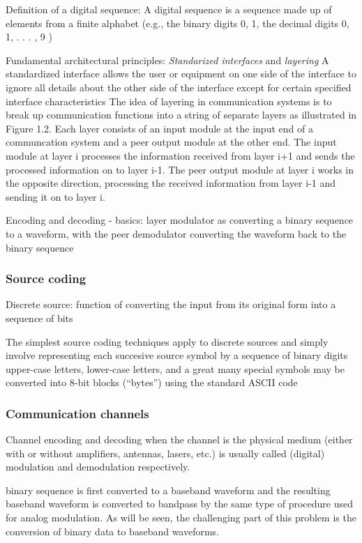 \documentclass[12pt,a4paper]{report}
\begin{document}
Definition of a digital sequence: A digital sequence is a sequence made up of elements from a finite alphabet (e.g., the binary digits {0, 1},
the decimal digits {0, 1, . . . , 9} )


Fundamental architectural principles:
	\textit{Standarized interfaces} and \textit{layering}
	A standardized interface allows the user or equipment on one side of the interface to ignore all
details about the other side of the interface except for certain specified interface characteristics
	The idea of layering in communication systems is to break up communication functions into a
string of separate layers as illustrated in Figure 1.2.
Each layer consists of an input module at the input end of a communcation system and a peer
output module at the other end. The input module at layer i processes the information received
from layer i+1 and sends the processed information on to layer i-1. The peer output module at
layer i works in the opposite direction, processing the received information from layer i-1 and
sending it on to layer i.

Encoding and decoding - basics: layer modulator as converting a
binary sequence to a waveform, with the peer demodulator converting the waveform back to the binary sequence

\subsubsection{Source coding}
	Discrete source:
	function of converting the input from its original
form into a sequence of bits

	The simplest source coding techniques apply to discrete sources and simply involve representing
each succesive source symbol by a sequence of binary digits
	upper-case letters, lower-case
letters, and a great many special symbols may be converted into 8-bit blocks (“bytes”) using
the standard ASCII code

\subsubsection{Communication channels}

	Channel encoding and decoding when the channel is the physical medium (either with or without amplifiers, antennas, lasers, etc.) is usually called (digital) modulation and demodulation
respectively. 


	binary sequence is first converted to a baseband
waveform and the resulting baseband waveform is converted to bandpass by the same type of
procedure used for analog modulation. As will be seen, the challenging part of this problem is the conversion of binary data to baseband waveforms.
\end{document}
